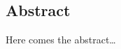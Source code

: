 \begin{otherlanguage}{english}
\chapter{Abstract}
Here comes the abstract\ldots
\end{otherlanguage}
